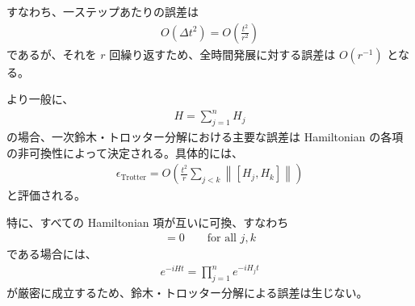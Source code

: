 \documentclass[a4paper,10.5pt]{article}
\numberwithin{equation}{section}
\begin{document}
すなわち、一ステップあたりの誤差は
\begin{align}
    O(\Delta t^2)
    =
    O\left(
        \frac{t^2}{r^2}
    \right)
\end{align}
であるが、それを $r$ 回繰り返すため、全時間発展に対する誤差は $O(r^{-1})$ となる。

より一般に、
\begin{align}
    H=\sum_{j=1}^{n}H_j
\end{align}
の場合、一次鈴木・トロッター分解における主要な誤差は Hamiltonian の各項の非可換性によって決定される。具体的には、
\begin{align}
    \epsilon_{\mathrm{Trotter}}
    =
    O\left(
        \frac{t^2}{r}
        \sum_{j<k}
        \left\|
            [H_j,H_k]
        \right\|
    \right)
\end{align}
と評価される。

特に、すべての Hamiltonian 項が互いに可換、すなわち
\begin{align}
    [H_j,H_k]=0
    \qquad
    \text{for all } j,k
\end{align}
である場合には、
\begin{align}
    e^{-iHt}
    =
    \prod_{j=1}^{n}
    e^{-iH_jt}
\end{align}
が厳密に成立するため、鈴木・トロッター分解による誤差は生じない。
\end{document}
